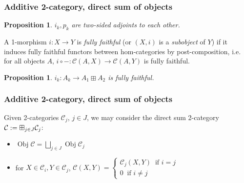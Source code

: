 \documentclass{beamer}
\DeclareMathOperator{\Obj}{Obj}
\newtheorem{proposition}[theorem]{Proposition}
\newcommand{\cC}{{\mathcal{C}}}
\newcommand{\bigboxplus}{\Huge \boxplus}
\begin{document}
\begin{frame}
\frametitle{Additive 2-category, direct sum of objects}

\begin{proposition}
$i_k,p_k$ are two-sided adjoints to each other.
\end{proposition}

\pause

\begin{definition}
A 1-morphism $i: X \to Y$ is \emph{fully faithful}
(or $(X,i)$ is a \emph{subobject} of $Y$)
if it induces fully faithful functors between hom-categories
by post-composition, i.e. for all objects $A$,
$i \circ - : \cC(A,X) \to \cC(A,Y)$
is fully faithful.
\end{definition}

\pause

\begin{proposition}
$i_k: A_k \to A_1 \boxplus A_2$ is fully faithful.
\end{proposition}


\end{frame}
\begin{frame}
\frametitle{Additive 2-category, direct sum of objects}

\begin{definition}
Given 2-categories $\cC_j$, $j \in J$,
we may consider the direct sum 2-category
$\cC := \bigboxplus_{j \in J} \cC_j$:
\begin{itemize}
\item $\Obj \cC = \bigsqcup_{j \in J} \Obj \cC_j$

\item for $X \in \cC_i, Y \in \cC_j$,
	$\cC(X,Y) =
\begin{cases}
	\cC_j(X,Y) \;\; \text{if } i = j
	\\
	0 \;\; \text{if } i \neq j
\end{cases}
$
\end{itemize}
\end{definition}

\end{frame}
\end{document}
